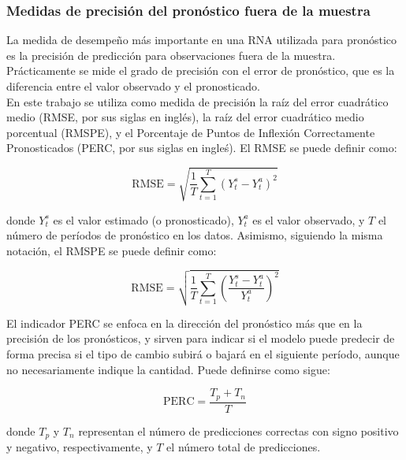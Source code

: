 \subsubsection{Medidas de precisión del pronóstico fuera de la muestra}

La medida de desempeño más importante en una RNA utilizada para pronóstico es la precisión de predicción para observaciones fuera de la muestra. Prácticamente se mide el grado de precisión con el error de pronóstico, que es la diferencia entre el valor observado y el pronosticado.\\

En este trabajo se utiliza como medida de precisión la raíz del error cuadrático medio (RMSE, por sus siglas en inglés), la raíz del error cuadrático medio porcentual (RMSPE), y el Porcentaje de Puntos de Inflexión Correctamente Pronosticados (PERC, por sus siglas en ingleś). El RMSE se puede definir como:

\begin{equation}
	\mathrm{RMSE} = \sqrt{\frac{1}{T} \sum_{t=1}^{T} (Y_t^s - Y_t^a)^2}
	\label{rmsedef}
\end{equation}

donde $Y_t^s$ es el valor estimado (o pronosticado), $Y_t^a$ es el valor observado, y $T$ el número de períodos de pronóstico en los datos. Asimismo, siguiendo la misma notación, el RMSPE se puede definir como: 

\begin{equation}
\mathrm{RMSE} = \sqrt{\frac{1}{T} \sum_{t=1}^{T} (\frac{Y_t^s - Y_t^a}{Y_t^a})^2}
\label{rmspedef}
\end{equation}

El indicador PERC se enfoca en la dirección del pronóstico más que en la precisión de los pronósticos, y sirven para indicar si el modelo puede predecir de forma precisa si el tipo de cambio subirá o bajará en el siguiente período, aunque no necesariamente indique la cantidad. Puede definirse como sigue: 

\begin{equation}
	\mathrm{PERC} = \frac{T_p + T_n}{T}
	\label{percdef}
\end{equation}

donde $T_p$ y $T_n$ representan el número de predicciones correctas con signo positivo y negativo, respectivamente, y $T$ el número total de predicciones.
